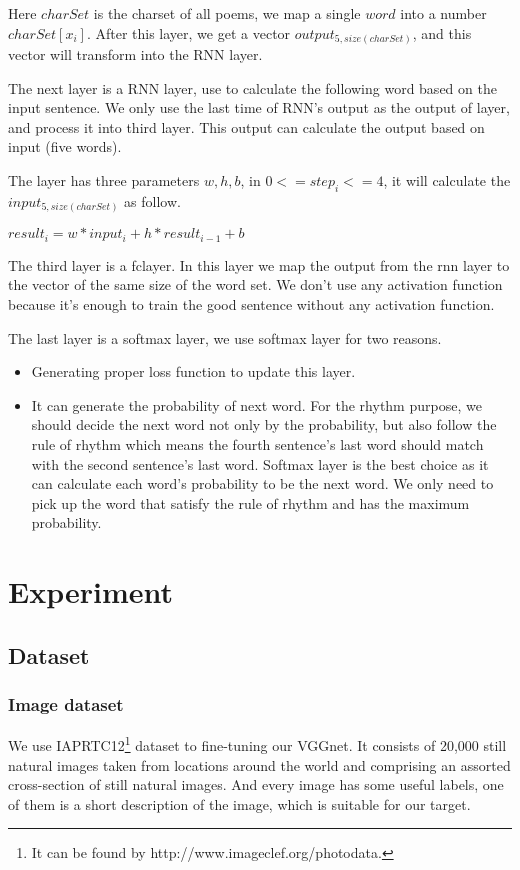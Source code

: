 \documentclass[10pt,twocolumn,letterpaper]{article}
\begin{document}
Here $charSet$ is the charset of all poems, we map a single $word$ into a number $charSet[x_{i}]$.
After this layer, we get a vector $output_{5, size(charSet)}$, and this vector will transform into the RNN layer.

The next layer is a RNN layer, use to calculate the following word based on the input sentence. We only use the last time of RNN’s output as the output of layer, and process it into third layer. This output can calculate the output based on input (five words).

The layer has three parameters $w, h, b$, in $0 <= step_{i} <= 4$, it will calculate the $input_{5, size(charSet)}$ as follow.
\begin{center}
    $result_{i} = w * input_{i} + h * result_{i - 1} + b$
\end{center}

The third layer is a fclayer. In this layer we map the output from the rnn layer to the vector of the same size of the word set. We don’t use any activation function because it’s enough to train the good sentence without any activation function.

The last layer is a softmax layer, we use softmax layer for two reasons.





\begin{itemize}
\item Generating proper loss function to update this layer.
\item It can generate the probability of next word. For the rhythm purpose, we should decide the next word not only by the probability, but also follow the rule of rhythm which means the fourth sentence’s last word should match with the second sentence’s last word. Softmax layer is the best choice as it can calculate each word’s probability to be the next word. We only need to pick up the word that satisfy the rule of rhythm and has the maximum probability. 
\end{itemize}

\section{Experiment}
\subsection{Dataset}
\subsubsection{Image dataset}
We use IAPRTC12\footnote{It can be found by http://www.imageclef.org/photodata.} dataset to fine-tuning our VGGnet. It consists of 20,000 still natural images taken from locations around the world and comprising an assorted cross-section of still natural images. And every image has some useful labels, one of them is a short description of the image, which is suitable for our target.
\end{document}
